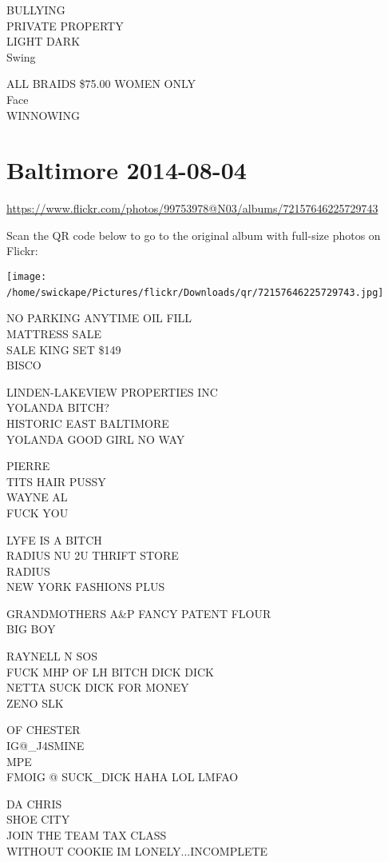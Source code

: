\documentclass[10pt,letterpaper]{article}
\begin{document}
BULLYING\\
PRIVATE PROPERTY\\
LIGHT DARK\\
Swing

ALL BRAIDS \$75.00 WOMEN ONLY\\
Face\\
WINNOWING
\

\section*{Baltimore 2014-08-04}

\url{https://www.flickr.com/photos/99753978@N03/albums/72157646225729743}

Scan the QR code below to go to the original album with full-size photos on Flickr:

\texttt{[image: /home/swickape/Pictures/flickr/Downloads/qr/72157646225729743.jpg]}
\

NO PARKING ANYTIME OIL FILL\\
MATTRESS SALE\\
SALE KING SET \$149\\
BISCO

LINDEN{-}LAKEVIEW PROPERTIES INC\\
YOLANDA BITCH?\\
HISTORIC EAST BALTIMORE\\
YOLANDA GOOD GIRL NO WAY

PIERRE\\
TITS HAIR PUSSY\\
WAYNE AL\\
FUCK YOU

LYFE IS A BITCH\\
RADIUS NU 2U THRIFT STORE\\
RADIUS\\
NEW YORK FASHIONS PLUS

GRANDMOTHERS A\&P FANCY PATENT FLOUR\\
BIG BOY

RAYNELL N SOS\\
FUCK MHP OF LH BITCH DICK DICK\\
NETTA SUCK DICK FOR MONEY\\
ZENO SLK

OF CHESTER\\
IG@\_J4SMINE\\
MPE\\
FMOIG @ SUCK\_DICK HAHA LOL LMFAO

DA CHRIS\\
SHOE CITY\\
JOIN THE TEAM TAX CLASS\\
WITHOUT COOKIE IM LONELY...INCOMPLETE
\end{document}
